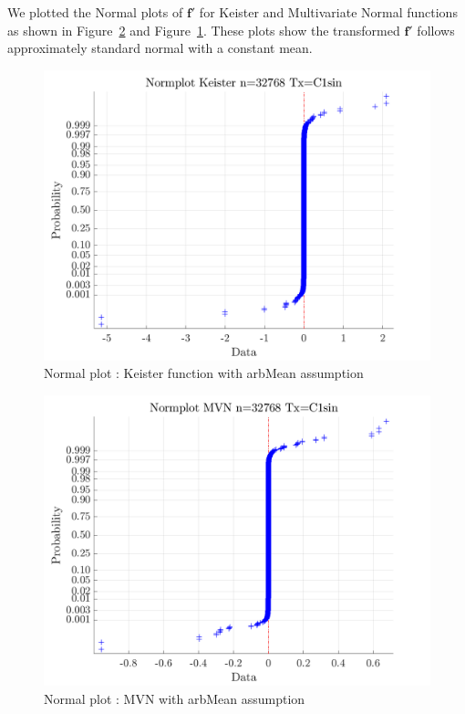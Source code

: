 \documentclass[twocolumn]{svjour3}          %
\newcommand{\bm}[1]{\boldsymbol{#1}}
\newcommand{\vf}{\bm{f}}
\newcommand\figref{Figure~\ref}
\begin{document}
We plotted the Normal plots of $\vf'$ for Keister and Multivariate Normal functions as shown in \figref{fig:mvn-normplot} and \figref{fig:keister-normplot}. These plots show the transformed $\vf'$ follows approximately standard normal with a constant mean.




\begin{figure}
	\centering
	\includegraphics[width=0.9\linewidth]{"figures/arbMean/Keister/C1sin/Keister Normplot d_2 bernoulli_2 Period_C1sin n_32768"}
	\caption{Normal plot : Keister function with arbMean assumption}
	\label{fig:keister-normplot}
\end{figure}




\begin{figure}
	\centering
	\includegraphics[width=0.9\linewidth]{"figures/arbMean/MVN/C1sin/MVN Normplot d_2 bernoulli_2 Period_C1sin n_32768"}
	\caption{Normal plot : MVN with arbMean assumption}
	\label{fig:mvn-normplot}
\end{figure}
\end{document}
